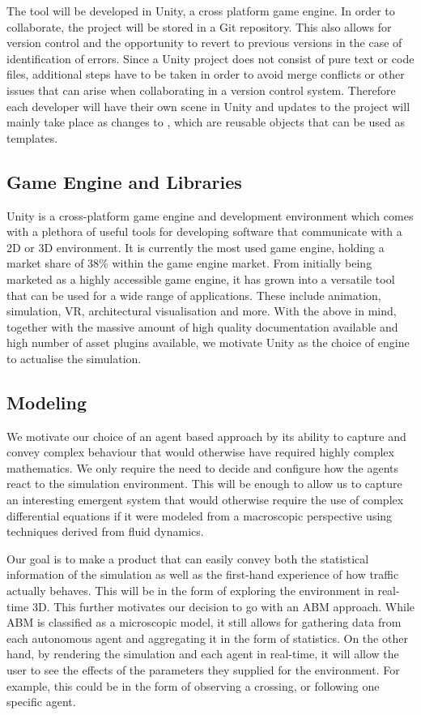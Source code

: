 The tool will be developed in Unity, a cross platform game engine. In order to collaborate, the project will be stored in a Git repository. This also allows for version control and the opportunity to revert to previous versions in the case of identification of errors. Since a Unity project does not consist of pure text or code files, additional steps have to be taken in order to avoid merge conflicts or other issues that can arise when collaborating in a version control system. Therefore each developer will have their own scene in Unity and updates to the project will mainly take place as changes to , which are reusable objects that can be used as templates.

\subsection{Game Engine and Libraries}
    Unity is a cross-platform game engine and development environment which comes with a plethora of useful tools for developing software that communicate with a 2D or 3D environment. It is currently the most used game engine, holding a market share of 38\% within the game engine market. From initially being marketed as a highly accessible game engine, it has grown into a versatile tool that can be used for a wide range of applications. These include animation, simulation, VR, architectural visualisation and more. With the above in mind, together with the massive amount of high quality documentation available and high number of asset plugins available, we motivate Unity as the choice of engine to actualise the simulation.

\subsection{Modeling}
    We motivate our choice of an agent based approach by its ability to capture and convey complex behaviour that would otherwise have required highly complex mathematics. We only require the need to decide and configure how the agents react to the simulation environment. This will be enough to allow us to capture an interesting emergent system that would otherwise require the use of complex differential equations if it were modeled from a macroscopic perspective using techniques derived from fluid dynamics.

    Our goal is to make a product that can easily convey both the statistical information of the simulation as well as the first-hand experience of how traffic actually behaves. This will be in the form of exploring the environment in real-time 3D. This further motivates our decision to go with an ABM approach. While ABM is classified as a microscopic model, it still allows for gathering data from each autonomous agent and aggregating it in the form of statistics. On the other hand, by rendering the simulation and each agent in real-time, it will allow the user to see the effects of the parameters they supplied for the environment. For example, this could be in the form of observing a crossing, or following one specific agent.

